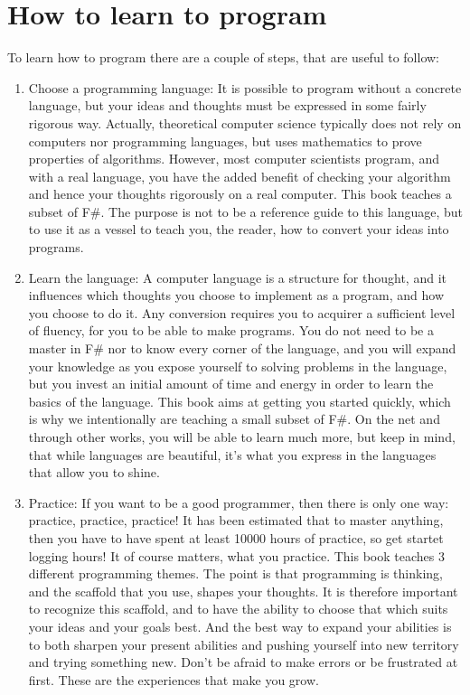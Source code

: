 \section{How to learn to program}
To learn how to program there are a couple of steps, that are useful to follow:
\begin{enumerate}
\item Choose a programming language: It is possible to program without a concrete language, but your ideas and thoughts must be expressed in some fairly rigorous way. Actually, theoretical computer science typically does not rely on computers nor programming languages, but uses mathematics to prove properties of algorithms. However, most computer scientists program, and with a real language, you have the added benefit of checking your algorithm and hence your thoughts rigorously on a real computer. This book teaches a subset of F\#. The purpose is not to be a reference guide to this language, but to use it as a vessel to teach you, the reader, how to convert your ideas into programs.
\item Learn the language: A computer language is a structure for thought, and it influences which thoughts you choose to implement as a program, and how you choose to do it. Any conversion requires you to acquirer a sufficient level of fluency, for you to be able to make programs. You do not need to be a master in F\# nor to know every corner of the language, and you will expand your knowledge as you expose yourself to solving problems in the language, but you invest an initial amount of time and energy in order to learn the basics of the language. This book aims at getting you started quickly, which is why we intentionally are teaching a small subset of F\#. On the net and through other works, you will be able to learn much more, but keep in mind, that while languages are beautiful, it's what you express in the languages that allow you to shine.
\item Practice: If you want to be a good programmer, then there is only one way: practice, practice, practice! It has been estimated that to master anything, then you have to have spent at least 10000 hours of practice, so get startet logging hours! It of course matters, what you practice. This book teaches 3 different programming themes. The point is that programming is thinking, and the scaffold that you use, shapes your thoughts. It is therefore important to recognize this scaffold, and to have the ability to choose that which suits your ideas and your goals best. And the best way to expand your abilities is to both sharpen your present abilities and pushing yourself into new territory and trying something new. Don't be afraid to make errors or be frustrated at first. These are the experiences that make you grow.

\end{enumerate}
